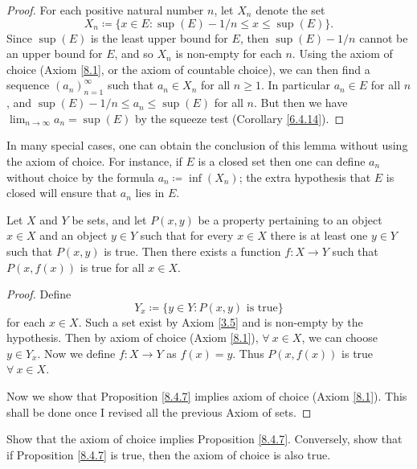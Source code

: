 \begin{proof}
    For each positive natural number \(n\), let \(X_n\) denote the set
    \[
        X_n \coloneqq \{x \in E : \sup(E) - 1 / n \leq x \leq \sup(E)\}.
    \]
    Since \(\sup(E)\) is the least upper bound for \(E\), then \(\sup(E) - 1 / n\) cannot be an upper bound for \(E\), and so \(X_n\) is non-empty for each \(n\).
    Using the axiom of choice (Axiom \ref{8.1}, or the axiom of countable choice), we can then find a sequence \((a_n)_{n = 1}^\infty\) such that \(a_n \in X_n\) for all \(n \geq 1\).
    In particular \(a_n \in E\) for all \(n\), and \(\sup(E) - 1 / n \leq a_n \leq \sup(E)\) for all \(n\).
    But then we have \(\lim_{n \to \infty} a_n = \sup(E)\) by the squeeze test (Corollary \ref{6.4.14}).
\end{proof}

\begin{remark}\label{8.4.6}
    In many special cases, one can obtain the conclusion of this lemma without using the axiom of choice.
    For instance, if \(E\) is a closed set then one can define \(a_n\) without choice by the formula \(a_n \coloneqq \inf(X_n)\);
    the extra hypothesis that \(E\) is closed will ensure that \(a_n\) lies in \(E\).
\end{remark}

\begin{proposition}\label{8.4.7}
    Let \(X\) and \(Y\) be sets, and let \(P(x, y)\) be a property pertaining to an object \(x \in X\) and an object \(y \in Y\) such that for every \(x \in X\) there is at least one \(y \in Y\) such that \(P(x, y)\) is true.
    Then there exists a function \(f : X \to Y\) such that \(P(x, f(x))\) is true for all \(x \in X\).
\end{proposition}

\begin{proof}
    Define
    \[
        Y_x \coloneqq \{y \in Y : P(x, y) \text{ is true}\}
    \]
    for each \(x \in X\).
    Such a set exist by Axiom \ref{3.5} and is non-empty by the hypothesis.
    Then by axiom of choice (Axiom \ref{8.1}), \(\forall\ x \in X\), we can choose \(y \in Y_x\).
    Now we define \(f : X \to Y\) as \(f(x) = y\).
    Thus \(P(x, f(x))\) is true \(\forall\ x \in X\).

    Now we show that Proposition \ref{8.4.7} implies axiom of choice (Axiom \ref{8.1}).
    This shall be done once I revised all the previous Axiom of sets.
\end{proof}

\exercisesection

\begin{exercise}\label{ex 8.4.1}
    Show that the axiom of choice implies Proposition \ref{8.4.7}.
    Conversely, show that if Proposition \ref{8.4.7} is true, then the axiom of choice is also true.
\end{exercise}